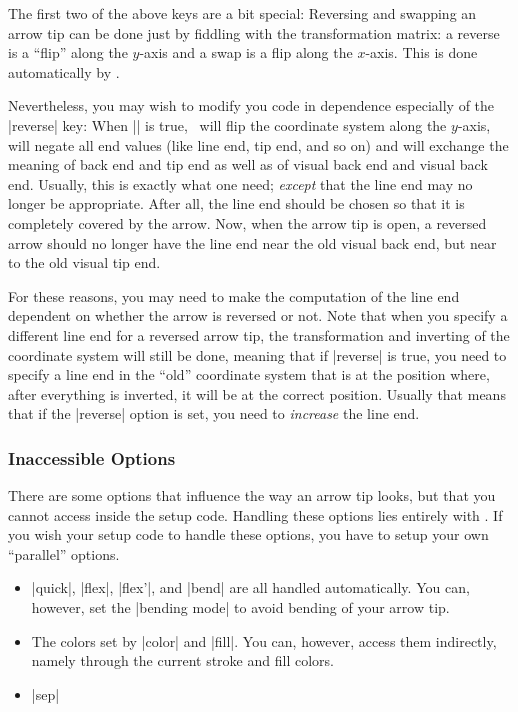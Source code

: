 The first two of the above keys are a bit special: Reversing and swapping an
arrow tip can be done just by fiddling with the transformation matrix: a
reverse is a ``flip'' along the $y$-axis and a swap is a flip along the
$x$-axis. This is done automatically by \pgfname.

Nevertheless, you may wish to modify you code in dependence especially of the
|reverse| key: When |\ifpgfarrowreverse| is true, \pgfname\ will flip the
coordinate system along the $y$-axis, will negate all end values (like line
end, tip end, and so on) and will exchange the meaning of back end and tip end
as well as of visual back end and visual back end. Usually, this is exactly
what one need; \emph{except} that the line end may no longer be appropriate.
After all, the line end should be chosen so that it is completely covered by
the arrow. Now, when the arrow tip is open, a reversed arrow should no longer
have the line end near the old visual back end, but near to the old visual tip
end.

For these reasons, you may need to make the computation of the line end
dependent on whether the arrow is reversed or not. Note that when you specify a
different line end for a reversed arrow tip, the transformation and inverting
of the coordinate system will still be done, meaning that if |reverse| is true,
you need to specify a line end in the ``old'' coordinate system that is at the
position where, after everything is inverted, it will be at the correct
position. Usually that means that if the |reverse| option is set, you need to
\emph{increase} the line end.


\subsubsection{Inaccessible Options}

There are some options that influence the way an arrow tip looks, but that you
cannot access inside the setup code. Handling these options lies entirely with
\pgfname. If you wish your setup code to handle these options, you have to
setup your own ``parallel'' options.
%
\begin{itemize}
    \item |quick|, |flex|, |flex'|, and |bend| are all handled automatically.
        You can, however, set the |bending mode| to avoid bending of your arrow
        tip.
    \item The colors set by |color| and |fill|. You can, however, access them
        indirectly, namely through the current stroke and fill colors.
    \item |sep|
\end{itemize}


